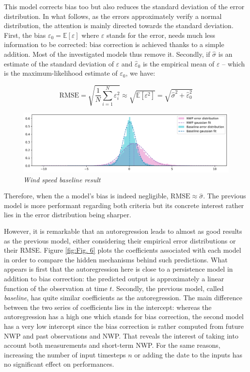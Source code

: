 \documentclass{article}
\newcommand{\saut}{\vspace{10px}}
\begin{document}
This model corrects bias too but also reduces the standard deviation of the error distribution. In what follows,
as the errors approximately verify a normal distribution, the attention is mainly directed towards the standard
deviation. First, the bias $\varepsilon_0 = \mathbb E [ \varepsilon ]$ where $\varepsilon$ stands for the error,
needs much less information to be corrected: bias correction is achieved thanks to a simple addition.
Most of the investigated models thus remove it. Secondly, if $\hat \sigma$ is an estimate
of the standard deviation of $\varepsilon$ and $\hat \varepsilon_0$ is the empirical mean
of $\varepsilon$ -- which is the maximum-likelihood estimate of $\varepsilon_0$, we have:

\saut

\[
	\mathrm{RMSE} = \sqrt{\frac{1}{N} \sum_{i = 1}^N \varepsilon^2_i} \approx \sqrt{ \mathbb E [\varepsilon^2] }
	= \sqrt{\hat \sigma^2 + \hat \varepsilon^2_0}
\]

\begin{figure}[H]
    \centering
    \includegraphics[width=\linewidth]{img/baseline.png}
    \caption{\textit{Wind speed baseline result}}
    \label{fig:Fig. 5}
\end{figure}

Therefore, when the a model's bias is indeed negligible, $\mathrm{RMSE} \approx \hat \sigma$.
The previous model is more performant regarding both criteria but its concrete interest
rather lies in the error distribution being sharper.

\saut

However, it is remarkable that an autoregression leads to almost as good results as the previous model, either
considering their empirical error distributions or their RMSE. Figure \ref{fig:Fig. 6} plots the coefficients associated with
each model in order to compare the hidden mechanisms behind such predictions. What appears is first that
the autoregression here is close to a persistence model in addition to bias correction: the predicted output is
approximately a linear function of the observation at time $t$. Secondly, the previous model, called \emph{baseline},
has quite similar coefficients as the autoregression. The main difference between the two series of coefficients
lies in the intercept: whereas the autoregression has a high one which stands for bias correction, the second model
has a very low intercept since the bias correction is rather computed from future NWP and past observations and NWP.
That reveals the interest of taking into account both measurements and short-term NWP. For the same reasons,
increasing the number of input timesteps $n$ or adding the date to the inputs has no significant effect on performances.
\end{document}
